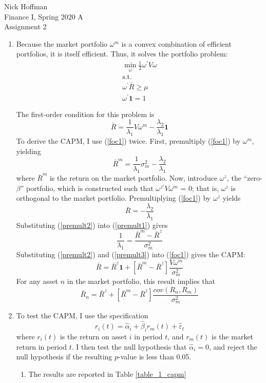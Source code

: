 \documentclass[11pt]{article}
\newcommand{\w}{\omega}
\newcommand{\p}{\prime}
\newcommand{\one}{\mathbf{1}}
\begin{document}
\begin{flushleft}
	Nick Hoffman \\
	Finance I, Spring 2020 A \\
	Assignment 2 \\
\end{flushleft}

\begin{enumerate}
	\item Because the market portfolio $ \w^m $ is a convex combination of efficient portfolios, it is itself efficient. Thus, it solves the portfolio problem:
	\begin{gather*}
	\min_\w \frac{1}{2}\w^\p V \w \\
	\text{s.t.} \\
	\w^\p \bar{R} \geq \mu \\
	\w^\p \one = 1
	\end{gather*}
	
	The first-order condition for this problem is 
	\begin{equation}\label{foc1}
	\bar{R} = \frac{1}{\lambda_1} V \w^m - \frac{\lambda_2}{\lambda_1} \one 
	\end{equation}
	To derive the CAPM, I use (\ref{foc1}) twice. First, premultiply (\ref{foc1}) by $ \w^m $, yielding
	\begin{equation}\label{premult1}
	\bar{R}^m = \frac{1}{\lambda_1} \sigma^2_m - \frac{\lambda_2}{\lambda_1}
	\end{equation}
	where $\bar{R}^m$ is the return on the market portfolio. Now, introduce $ \w^z $, the ``zero-$ \beta $'' portfolio, which is constructed such that $ \w^{z\p}V \w^m  $ = 0; that is, $ \w^z $ is orthogonal to the market portfolio. Premultiplying (\ref{foc1}) by $ \w^z $ yields
	\begin{equation}\label{premult2}
	\bar{R} = -\frac{\lambda_2}{\lambda_1} 
	\end{equation}
	Substituting (\ref{premult2}) into (\ref{premult1}) gives
	\begin{equation}\label{premult3}
	\frac{1}{\lambda_1} = \frac{\bar{R}^m - \bar{R}^z}{\sigma_m^2}
	\end{equation}
	Substituting (\ref{premult2}) and (\ref{premult3}) into (\ref{foc1}) gives the CAPM:
	\[\bar{R} = \bar{R}^z \one + [\bar{R}^m - \bar{R}^z]\frac{V\w^m}{\sigma_m^2}\]
	For any asset $ n $ in the market portfolio, this result implies that
	\[\bar{R}_n = \bar{R}^z  + [\bar{R}^m - \bar{R}^z]\frac{cov(R_n, R_m)}{\sigma_m^2}\]
	
	\item To test the CAPM, I use the specification 
	\[r_i(t) = \hat{\alpha}_i + \hat{\beta}_i r_m(t) + \hat{\varepsilon}_t\]
	where $ r_i(t) $ is the return on asset $ i $ in period $ t $, and $ r_m(t) $ is the market return in period $ t $. I then test the null hypothesis that $ \hat{\alpha}_i = 0 $, and reject the null hypothesis if the resulting $ p $-value is less than 0.05. 
	\begin{enumerate}
		\item The results are reported in Table \ref{table_1_capm} \newpage
		

\end{enumerate}
\end{enumerate}
\end{document}

